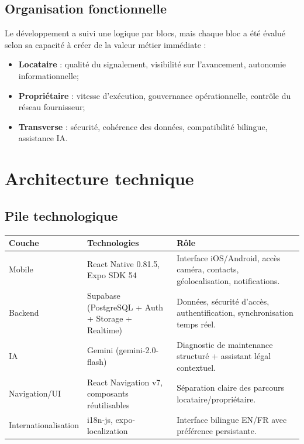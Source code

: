 \documentclass[11pt,a4paper]{article}
\begin{document}
\subsection{Organisation fonctionnelle}

Le développement a suivi une logique par blocs, mais chaque bloc a été évalué selon sa capacité à créer de la valeur métier immédiate :

\begin{itemize}[leftmargin=1.4em]
  \item \textbf{Locataire} : qualité du signalement, visibilité sur l'avancement, autonomie informationnelle;
  \item \textbf{Propriétaire} : vitesse d'exécution, gouvernance opérationnelle, contrôle du réseau fournisseur;
  \item \textbf{Transverse} : sécurité, cohérence des données, compatibilité bilingue, assistance IA.
\end{itemize}

\section{Architecture technique}

\subsection{Pile technologique}

\begin{longtable}{>{\raggedright\arraybackslash}p{3.5cm} >{\raggedright\arraybackslash}p{4cm} >{\raggedright\arraybackslash}p{7.5cm}}
\toprule
\textbf{Couche} & \textbf{Technologies} & \textbf{Rôle}\\
\midrule
Mobile & React Native 0.81.5, Expo SDK 54 & Interface iOS/Android, accès caméra, contacts, géolocalisation, notifications.\\
Backend & Supabase (PostgreSQL + Auth + Storage + Realtime) & Données, sécurité d'accès, authentification, synchronisation temps réel.\\
IA & Gemini (gemini-2.0-flash) & Diagnostic de maintenance structuré + assistant légal contextuel.\\
Navigation/UI & React Navigation v7, composants réutilisables & Séparation claire des parcours locataire/propriétaire.\\
Internationalisation & i18n-js, expo-localization & Interface bilingue EN/FR avec préférence persistante.\\
\bottomrule
\end{longtable}
\end{document}
